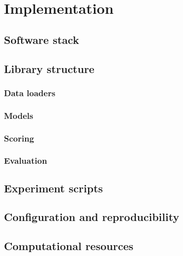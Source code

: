 \chapter{Implementation}
\label{ch:implementation}

\section{Software stack}

\section{Library structure}
\subsection{Data loaders}
\subsection{Models}
\subsection{Scoring}
\subsection{Evaluation}

\section{Experiment scripts}

\section{Configuration and reproducibility}

\section{Computational resources}
